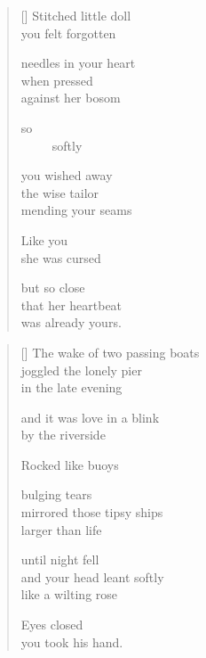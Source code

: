 \documentclass[14pt]{extbook}
\newcommand*{\centeredornament}{\centerline{\pgfornament[width=6cm]{88}}}
\begin{document}

\newpage

\vspace*{-15mm}
\centeredornament
\vspace*{-7mm}


\settowidth{\versewidth}{needles in your heart}

\begin{verse}[\versewidth]
  Stitched little doll \\
  you felt forgotten

  needles in your heart \\
  when pressed \\
  against her bosom

  so \\
  \ \ \ \ \ softly

  you wished away \\
  the wise tailor \\
  mending your seams

  Like you \\
  she was cursed

  but so close \\
  that her heartbeat \\
  was already yours.
\end{verse}


\newpage

\vspace*{-15mm}
\centeredornament
\vspace*{-7mm}


\settowidth{\versewidth}{The wake of two passing boats}

\begin{verse}[\versewidth]
  The wake of two passing boats \\
  joggled the lonely pier \\
  in the late evening

  and it was love in a blink \\
  by the riverside

  Rocked like buoys

  bulging tears \\
  mirrored those tipsy ships \\
  larger than life

  until night fell \\
  and your head leant softly \\
  like a wilting rose

  Eyes closed \\
  you took his hand.
\end{verse}
\end{document}
